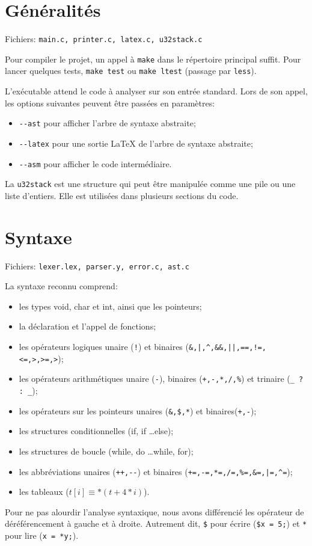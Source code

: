\documentclass{article}
\begin{document}
	\section{Généralités}
		\par Fichiers: \verb#main.c, printer.c, latex.c, u32stack.c#
		\par Pour compiler le projet, un appel à \verb#make# dans le répertoire principal suffit. Pour lancer quelques tests, \verb#make test# ou \verb#make ltest# (passage par \verb#less#).
		\par L'exécutable attend le code à analyser sur son entrée standard. Lors de son appel, les options suivantes peuvent être passées en paramètres:
		\begin{itemize}
			\item \verb#--ast# pour afficher l'arbre de syntaxe abstraite;
			\item \verb#--latex# pour une sortie LaTeX de l'arbre de syntaxe abstraite;
			\item \verb#--asm# pour afficher le code intermédiaire.
		\end{itemize}
		\par La \verb#u32stack# est une structure qui peut être manipulée comme une pile ou une liste d'entiers. Elle est utilisées dans plusieurs sections du code.
	\section{Syntaxe}
		\par Fichiers: \verb#lexer.lex, parser.y, error.c, ast.c#
		\par La syntaxe reconnu comprend:
		\begin{itemize}
			\item les types void, char et int, ainsi que les pointeurs;
			\item la déclaration et l'appel de fonctions;
			\item les opérateurs logiques unaire (\verb#!#) et binaires (\verb#&,|,^,&&,||,==,!=,<=,>,>=,>#);
			\item les opérateurs arithmétiques unaire (\verb#-#), binaires (\verb#+,-,*,/,%#) et trinaire (\verb#_ ? : _#);
			\item les opérateurs sur les pointeurs unaires (\verb#&,$,*#) et binaires(\verb#+,-#);
			\item les structures conditionnelles (if, if \dots else);
			\item les structures de boucle (while, do \dots while, for);
			\item les abbréviations unaires (\verb#++,--#) et binaires (\verb#+=,-=,*=,/=,%=,&=,|=,^=#);
			\item les tableaux ($t[i] \equiv *(t + 4*i)$).
		\end{itemize}
		\par Pour ne pas alourdir l'analyse syntaxique, nous avons différencié les opérateur de déréférencement à gauche et à droite. Autrement dit, \verb#$# pour écrire (\verb#$x = 5;#) et \verb#*# pour lire (\verb#x = *y;#).
\end{document}
